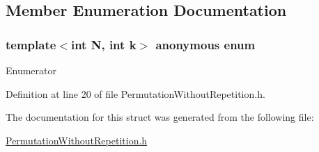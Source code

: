 \subsection{Member Enumeration Documentation}
\hypertarget{structmodel_1_1_permutation_without_repetition_ab628f5a3783b9932f814465259345e9e}{}\subsubsection[{anonymous enum}]{\setlength{\rightskip}{0pt plus 5cm}template$<$int N, int k$>$ anonymous enum}\label{structmodel_1_1_permutation_without_repetition_ab628f5a3783b9932f814465259345e9e}
\begin{Desc}
\item[Enumerator]\par
\begin{description}
\item[{\em 
\hypertarget{structmodel_1_1_permutation_without_repetition_ab628f5a3783b9932f814465259345e9ea0aef86f534d9f1c9b286cf148ab91264}{}value\label{structmodel_1_1_permutation_without_repetition_ab628f5a3783b9932f814465259345e9ea0aef86f534d9f1c9b286cf148ab91264}
}]\end{description}
\end{Desc}


Definition at line 20 of file Permutation\+Without\+Repetition.\+h.



The documentation for this struct was generated from the following file\+:\begin{DoxyCompactItemize}
\item 
\hyperlink{_permutation_without_repetition_8h}{Permutation\+Without\+Repetition.\+h}\end{DoxyCompactItemize}
